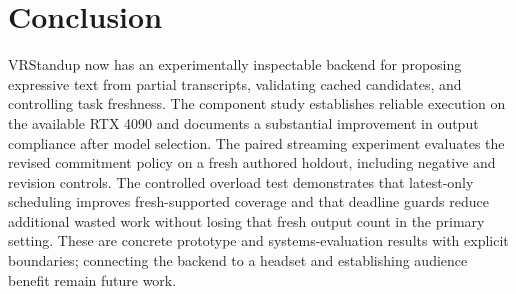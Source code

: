 \section{Conclusion}
VRStandup now has an experimentally inspectable backend for proposing expressive text from partial transcripts, validating cached candidates, and controlling task freshness. The component study establishes reliable execution on the available RTX 4090 and documents a substantial improvement in output compliance after model selection. The paired streaming experiment evaluates the revised commitment policy on a fresh authored holdout, including negative and revision controls. The controlled overload test demonstrates that latest-only scheduling improves fresh-supported coverage and that deadline guards reduce additional wasted work without losing that fresh output count in the primary setting. These are concrete prototype and systems-evaluation results with explicit boundaries; connecting the backend to a headset and establishing audience benefit remain future work.
